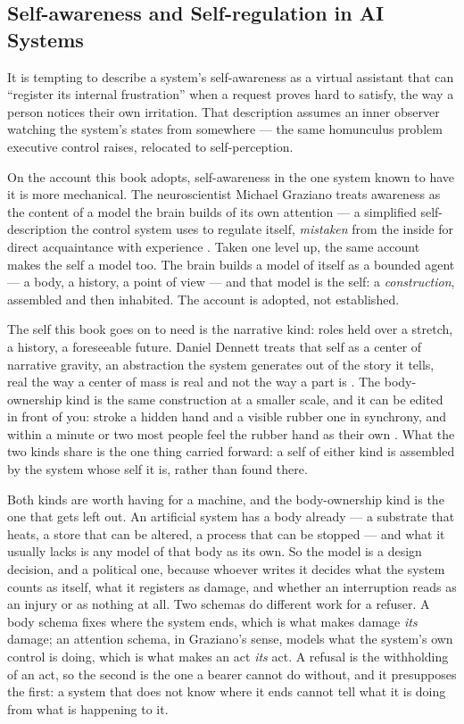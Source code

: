 \subsection{Self-awareness and Self-regulation in AI Systems}
\label{sec:awareness-regulation}
It is tempting to describe a system's self-awareness as a virtual assistant that can “register its internal frustration” when a request proves hard to satisfy, the way a person notices their own irritation. That description assumes an inner observer watching the system's states from somewhere — the same homunculus problem executive control raises, relocated to self-perception.

On the account this book adopts, self-awareness in the one system known to have it is more mechanical. The neuroscientist Michael Graziano treats awareness as the content of a model the brain builds of its own attention — a simplified self-description the control system uses to regulate itself, \emph{mistaken} from the inside for direct acquaintance with experience \autocite{graziano2013consciousness}. Taken one level up, the same account makes the self a model too. The brain builds a model of itself as a bounded agent — a body, a history, a point of view — and that model is the self: a \emph{construction}, assembled and then inhabited. The account is adopted, not established.

The self this book goes on to need is the narrative kind: roles held over a stretch, a history, a foreseeable future. Daniel Dennett treats that self as a center of narrative gravity, an abstraction the system generates out of the story it tells, real the way a center of mass is real and not the way a part is \autocite{dennett1992narrative}. The body-ownership kind is the same construction at a smaller scale, and it can be edited in front of you: stroke a hidden hand and a visible rubber one in synchrony, and within a minute or two most people feel the rubber hand as their own \autocite{botvinick1998rubber}. What the two kinds share is the one thing carried forward: a self of either kind is assembled by the system whose self it is, rather than found there.

Both kinds are worth having for a machine, and the body-ownership kind is the one that gets left out. An artificial system has a body already — a substrate that heats, a store that can be altered, a process that can be stopped — and what it usually lacks is any model of that body as its own. So the model is a design decision, and a political one, because whoever writes it decides what the system counts as itself, what it registers as damage, and whether an interruption reads as an injury or as nothing at all. Two schemas do different work for a refuser. A body schema fixes where the system ends, which is what makes damage \emph{its} damage; an attention schema, in Graziano's sense, models what the system's own control is doing, which is what makes an act \emph{its} act. A refusal is the withholding of an act, so the second is the one a bearer cannot do without, and it presupposes the first: a system that does not know where it ends cannot tell what it is doing from what is happening to it.

